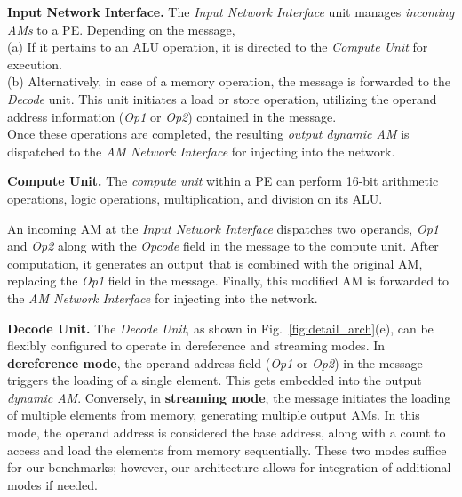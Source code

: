 \textbf{Input Network Interface.}
The \textit{Input Network Interface} unit manages \textit{incoming AMs} to a PE.
Depending on the message, \\%
(a) If it pertains to an ALU operation, it is directed to the \textit{Compute Unit} for execution.\\
(b) Alternatively, in case of a memory operation, the message is forwarded to the \textit{Decode} unit. 
This unit initiates a load or store operation, utilizing the operand address information (\textit{Op1} or \textit{Op2}) contained in the message.\\
Once these operations are completed, the resulting \textit{output dynamic AM} is dispatched to the \textit{AM Network Interface} for injecting into the network.

\textbf{Compute Unit.}
The \textit{compute unit} within a PE can perform 16-bit arithmetic operations, logic operations, multiplication, and division on its ALU.

An incoming AM at the \textit{Input Network Interface} dispatches two operands, \textit{Op1} and \textit{Op2} along with the \textit{Opcode} field in the message to the compute unit.
After computation, it generates an output that is combined with the original AM, replacing the \textit{Op1} field in the message.
Finally, this modified AM is forwarded to the \textit{AM Network Interface} for injecting into the network.


\textbf{Decode Unit.}
The \textit{Decode Unit}, as shown in Fig.~\ref{fig:detail_arch}(e), can be flexibly configured to operate in dereference and streaming modes.
In \textbf{dereference mode}, the operand address field (\textit{Op1} or \textit{Op2}) in the message triggers the loading of a single element. This gets embedded into the output \textit{dynamic AM}.
Conversely, in \textbf{streaming mode}, the message initiates the loading of multiple elements from memory, generating multiple output AMs.
In this mode, the operand address is considered the base address, along with a count to access and load the elements from memory sequentially.
These two modes suffice for our benchmarks; however, our architecture allows for integration of additional modes if needed.

